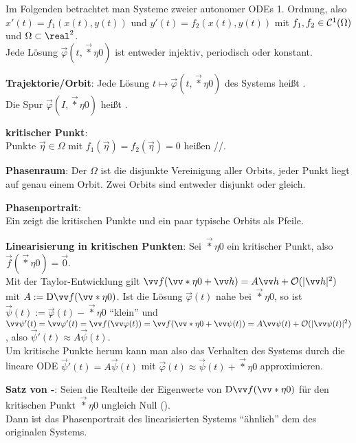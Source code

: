 Im Folgenden betrachtet man Systeme zweier autonomer ODEs 1. Ordnung, also\\
$x'(t) = f_1(x(t), y(t))$ und $y'(t) = f_2(x(t), y(t))$ mit
$f_1, f_2 \in \mathcal{C}^1(\Omega)$ und $\Omega \subset \real^2$.\\
Jede Lösung $\vec{\varphi}(t, \vec*{\eta}{0})$ ist entweder injektiv, periodisch oder konstant.

\textbf{Trajektorie/Orbit}:
Jede Lösung $t \mapsto \vec{\varphi}(t, \vec*{\eta}{0})$ des Systems heißt .\\
Die Spur $\vec{\varphi}(I, \vec*{\eta}{0})$ heißt .

\textbf{kritischer Punkt}:\\
Punkte $\vec{\eta} \in \Omega$ mit $f_1(\vec{\eta}) = f_2(\vec{\eta}) = 0$ heißen
//.

\textbf{Phasenraum}:
Der  $\Omega$ ist die disjunkte Vereinigung aller Orbits,
jeder Punkt liegt auf genau einem Orbit.
Zwei Orbits sind entweder disjunkt oder gleich.

\textbf{Phasenportrait}:\\
Ein  zeigt die kritischen Punkte und ein paar typische Orbits
als Pfeile.

\linie

\textbf{Linearisierung in kritischen Punkten}:
Sei $\vec*{\eta}{0}$ ein kritischer Punkt, also $\vec{f}(\vec*{\eta}{0}) = \vec{0}$.\\
Mit der Taylor-Entwicklung gilt $\vec{f}(\vec*{\eta}{0} + \vec{h}) = A\vec{h} + \O(|\vec{h}|^2)$
mit $A := \D\vec{f}(\vec*{\eta}{0})$.
Ist die Lösung $\vec{\varphi}(t)$ nahe bei $\vec*{\eta}{0}$, so ist
$\vec{\psi}(t) := \vec{\varphi}(t) - \vec*{\eta}{0}$ "`klein"' und\\
$\vec{\psi}'(t) = \vec{\varphi}'(t) = \vec{f}(\vec{\varphi}(t))
= \vec{f}(\vec*{\eta}{0} + \vec{\psi}(t)) = A\vec{\psi}(t) + \O(|\vec{\psi}(t)|^2)$,
also $\vec{\psi}'(t) \approx A\vec{\psi}(t)$.\\
Um kritische Punkte herum kann man also das Verhalten des Systems durch
die lineare ODE $\vec{\psi}'(t) = A\vec{\psi}(t)$ mit
$\vec{\varphi}(t) \approx \vec{\psi}(t) + \vec*{\eta}{0}$ approximieren.

\textbf{Satz von -}:
Seien die Realteile der Eigenwerte von $\D\vec{f}(\vec*{\eta}{0})$ für den kritischen Punkt
$\vec*{\eta}{0}$ ungleich Null ().\\
Dann ist das Phasenportrait des linearisierten Systems "`ähnlich"' dem des originalen Systems.

